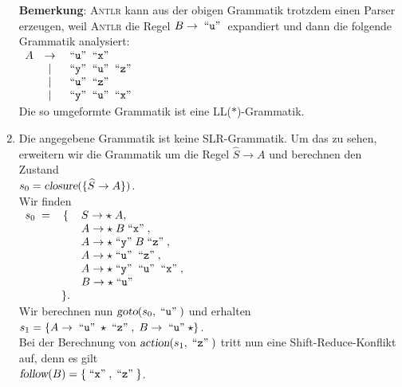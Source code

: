 \documentclass{article}
\newcommand{\quoted}[1]{\;\mbox{``\texttt{#1}''}\;}
\begin{document}
\begin{enumerate}
      \textbf{Bemerkung}:
      \textsc{Antlr} kann aus der obigen Grammatik trotzdem einen Parser erzeugen, weil \textsc{Antlr}
      die Regel $B \rightarrow \quoted{u}$ expandiert und dann die folgende Grammatik analysiert:
      \\[0.2cm]
      \hspace*{1.3cm}
      $\begin{array}[t]{lcl}
        A & \rightarrow & \quoted{u} \quoted{x} \\
          & \mid        & \quoted{y} \quoted{u} \quoted{z} \\
          & \mid        & \quoted{u} \quoted{z} \\
          & \mid        & \quoted{y} \quoted{u} \quoted{x} 
        \end{array}
       $
       \\[0.2cm]
       Die so umgeformte Grammatik ist eine LL($*$)-Grammatik.
\item Die angegebene Grammatik ist keine SLR-Grammatik.  Um das zu sehen, erweitern wir die Grammatik
      um die Regel $\widehat{S} \rightarrow A$ und berechnen den Zustand
      \\[0.2cm]
      \hspace*{1.3cm}
      $s_0 = \textsl{closure}( \{ \widehat{S} \rightarrow A \})$.
      \\[0.2cm]
      Wir finden
      \\[0.2cm]
      \hspace*{1.3cm}
      $
      \begin{array}[t]{lcl}  
       s_0 \;= & \{ & S \rightarrow \star\; A,                              \\
               &    & A \rightarrow \star\; B \quoted{x},                   \\
               &    & A \rightarrow \star \quoted{y} B \quoted{z},          \\
               &    & A \rightarrow \star \quoted{u} \quoted{z},            \\
               &    & A \rightarrow \star \quoted{y} \quoted{u} \quoted{x}, \\
               &    & B \rightarrow \star \quoted{u}                        \\
               & \}. 
      \end{array}
      $
      \\[0.2cm]
      Wir berechnen nun $\textsl{goto}(s_0, \quoted{u})$ und erhalten
      \\[0.2cm]
      \hspace*{1.3cm}
      $s_1 = \{ A \rightarrow \quoted{u} \star \quoted{z},\;
                B \rightarrow \quoted{u} \star
             \}
      $.
      \\[0.2cm]
      Bei der Berechnung von $\textsl{action}(s_1, \quoted{z})$ tritt nun eine Shift-Reduce-Konflikt auf,
      denn es gilt
      \\[0.2cm]
      \hspace*{1.3cm}
      $\textsl{follow}(B) = \{ \quoted{x}, \quoted{z} \}$.


\end{enumerate}
\end{document}

